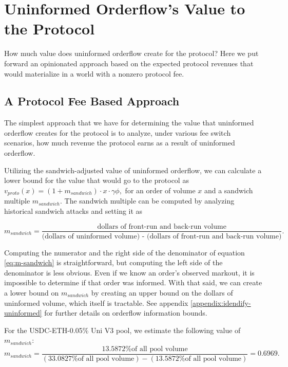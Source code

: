 \section{Uninformed Orderflow's Value to the Protocol} \label{section:protocol-lpcapital-value}

How much value does uninformed orderflow create for the protocol? Here we put forward an opinionated approach based on the expected protocol revenues that would materialize in a world with a nonzero protocol fee.

\subsection{A Protocol Fee Based Approach}

    The simplest approach that we have for determining the value that uninformed orderflow creates for the protocol is to analyze, under various fee switch scenarios, how much revenue the protocol earns as a result of uninformed orderflow.


    Utilizing the sandwich-adjusted value of uninformed orderflow, we can calculate a lower bound for the value that would go to the protocol as
        $v_{proto}(x) = (1+m_{sandwich}) \cdot x \cdot \gamma \phi,$
    for an order of volume $x$ and a sandwich multiple $m_{sandwich}$. The sandwich multiple can be computed by analyzing historical sandwich attacks and setting it as 

    \begin{equation} \label{eq:m-sandwich}
        m_{sandwich} = \frac{\text{dollars of front-run and back-run volume}}{\text{(dollars of uninformed volume) - (dollars of front-run and back-run volume)}}.
    \end{equation}
    
    Computing the numerator and the right side of the denominator of equation \ref{eq:m-sandwich} is straightforward, but computing the left side of the denominator is less obvious. Even if we know an order's observed markout, it is impossible to determine if that order was informed. With that said, we can create a lower bound on $m_{sandwich}$ by creating an upper bound on the dollars of uninformed volume, which itself is tractable. See appendix \ref{appendix:idendify-uninformed} for further details on orderflow information bounds.

    For the USDC-ETH-0.05\% Uni V3 pool, we estimate the following value of $m_{sandwich}$:
    \begin{equation}
        m_{sandwich} = \frac{{\text{13.5872\% of all pool volume}}}{(\text{33.0827\% of all pool volume}) - (\text{13.5872\% of all pool volume})} = 0.6969.
    \end{equation}
    
